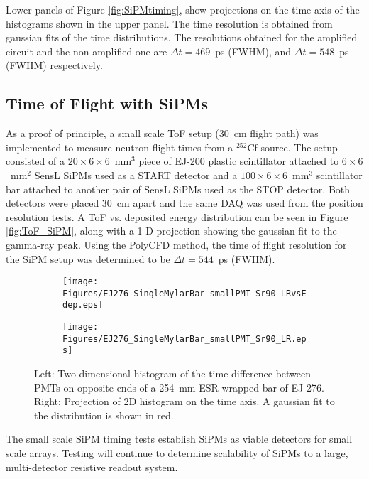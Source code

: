 Lower panels of Figure \ref{fig:SiPMtiming}, show projections on the time axis of the histograms shown in the upper panel. The time resolution is obtained from  gaussian fits of the time distributions. The resolutions obtained for the amplified circuit and the non-amplified one are $\Delta t=469$~ps (FWHM), and $\Delta t=548$~ps (FWHM) respectively.

\subsection{Time of Flight with SiPMs}

As a proof of principle, a small scale ToF setup (30~cm flight path) was implemented to measure neutron flight times from a $^{252}$Cf source. The setup consisted of a $20\times6\times6$~mm$^3$  piece of EJ-200 plastic scintillator attached to $6\times6$~mm$^2$ SensL\textsuperscript{\textregistered} SiPMs used as a START detector and a  $100\times6\times6$~mm$^3$ scintillator bar attached to another pair of SensL\textsuperscript{\textregistered} SiPMs used as the STOP detector. Both detectors were placed 30~cm apart and the same DAQ was used from the position resolution tests. A ToF vs. deposited energy distribution can be seen in Figure \ref{fig:ToF_SiPM}, along with a 1-D projection showing the gaussian fit to the gamma-ray peak. Using the PolyCFD method, the time of flight resolution for the SiPM setup was determined to be $\Delta t=544$~ps (FWHM).
\begin{figure}[bt]
  \centering
  \begin{subfigure}{0.5\linewidth}
    \raggedleft
    \texttt{[image: Figures/EJ276\_SingleMylarBar\_smallPMT\_Sr90\_LRvsEdep.eps]}
  \end{subfigure}%
  \begin{subfigure}{0.5\linewidth}
    \raggedright
    \texttt{[image: Figures/EJ276\_SingleMylarBar\_smallPMT\_Sr90\_LR.eps]}
  \end{subfigure}%
  \caption{Left: Two-dimensional histogram of the time difference between PMTs on opposite ends of a 254~mm ESR wrapped bar of EJ-276. Right: Projection of 2D histogram on the time axis. A gaussian fit to the distribution is shown in red.}
  \label{fig:MylarTiming}
\end{figure}

The small scale SiPM timing tests establish SiPMs as viable detectors for small scale arrays. Testing will continue to determine scalability of SiPMs to a large, multi-detector resistive readout system.

